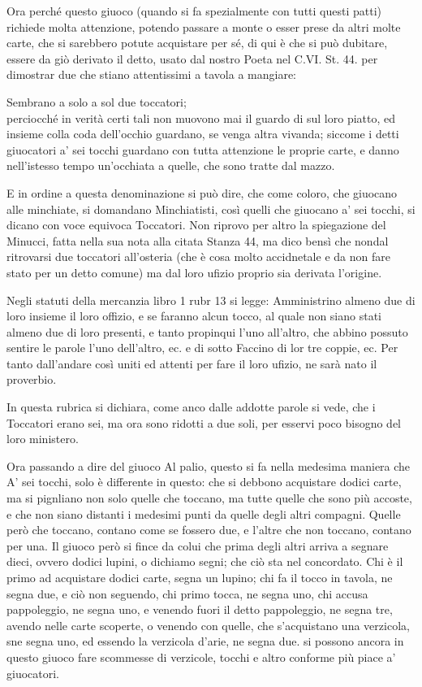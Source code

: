 Ora perché questo giuoco (quando si fa spezialmente con tutti questi
patti) richiede molta attenzione, potendo passare a monte o esser prese
da altri molte carte, che si sarebbero potute acquistare per sé, di qui
è che si può dubitare, essere da giò derivato il detto, usato dal
nostro Poeta nel C.VI. St. 44. per dimostrar due che stiano
attentissimi a tavola a mangiare:

Sembrano a solo a sol due toccatori;\\ perciocché in verità certi tali
non muovono mai il guardo di sul loro piatto, ed insieme colla coda
dell'occhio guardano, se venga altra vivanda; siccome i detti
giuocatori a' sei tocchi guardano con tutta attenzione le proprie
carte, e danno nell'istesso tempo un'occhiata a quelle, che sono tratte
dal mazzo.

E in ordine a questa denominazione si può dire, che come coloro, che giuocano alle minchiate, si domandano Minchiatisti, così quelli che giuocano a' sei tocchi, si dicano con voce equivoca Toccatori.  Non riprovo per altro la spiegazione del Minucci, fatta nella sua nota alla citata Stanza 44, ma dico bensì che nondal ritrovarsi due toccatori all'osteria (che è cosa molto accidnetale e da non fare stato per un detto comune) ma dal loro ufizio proprio sia derivata l'origine.

Negli statuti della mercanzia libro 1 rubr 13 si legge: Amministrino almeno due di loro insieme il loro offizio, e se faranno alcun tocco, al quale non siano stati almeno due di loro presenti, e tanto propinqui l'uno all'altro, che abbino possuto sentire le parole l'uno dell'altro, ec. e di sotto Faccino di lor tre coppie, ec. Per tanto dall'andare così uniti ed attenti per fare il loro ufizio, ne sarà nato il proverbio.

In questa rubrica si dichiara, come anco dalle addotte parole si vede, che i Toccatori erano sei, ma ora sono ridotti a due soli, per esservi poco bisogno del loro ministero.

Ora passando a dire del giuoco Al palio, questo si fa nella medesima
maniera che A' sei tocchi, solo è differente in questo: che si debbono
acquistare dodici carte, ma si pignliano non solo quelle che toccano,
ma tutte quelle che sono più accoste, e che non siano distanti i
medesimi punti da quelle degli altri compagni. Quelle però che toccano,
contano come se fossero due, e l'altre che non toccano, contano per
una.  Il giuoco però si fince da colui che prima degli altri arriva a
segnare dieci, ovvero dodici lupini, o dichiamo segni; che ciò sta nel
concordato.  Chi è il primo ad acquistare dodici carte, segna un
lupino; chi fa il tocco in tavola, ne segna due, e ciò non seguendo,
chi primo tocca, ne segna uno, chi accusa pappoleggio, ne segna uno, e
venendo fuori il detto pappoleggio, ne segna tre, avendo nelle carte
scoperte, o venendo con quelle, che s'acquistano una verzicola, sne
segna uno, ed essendo la verzicola d'arie, ne segna due. si possono
ancora in questo giuoco fare scommesse di verzicole, tocchi e altro
conforme più piace a' giuocatori.


